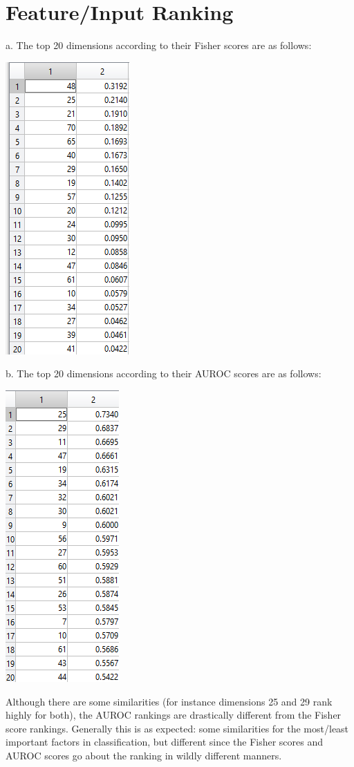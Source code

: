 \documentclass{article}
\begin{document}
\section{Feature/Input Ranking}

a. The top 20 dimensions according to their Fisher scores are as follows: 

\begin{center}
    \includegraphics[scale=0.75]{3a.png}
\end{center}

b. The top 20 dimensions according to their AUROC scores are as follows: 

\begin{center}
    \includegraphics[scale=0.75]{3b.png}
\end{center}

\noindent
Although there are some similarities (for instance dimensions 25 and 29 rank highly for both), the AUROC rankings are drastically different from the Fisher score rankings. Generally this is as expected: some similarities for the most/least important factors in classification, but different since the Fisher scores and AUROC scores go about the ranking in wildly different manners.
\end{document}
